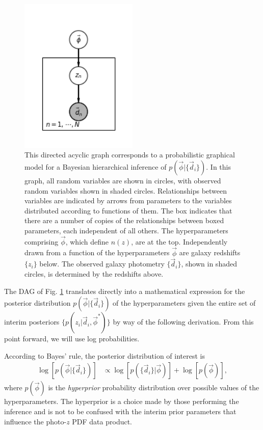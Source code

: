 \documentclass[iop]{emulateapj}
\begin{document}
\begin{figure}
	\begin{center}
		\includegraphics[width=0.5\textwidth]{pgm.png}
		\caption{This directed acyclic graph corresponds to a probabilistic graphical model for a Bayesian hierarchical inference of $p(\vec{\phi}|\{\vec{d}_{i}\})$.  In this graph, all random variables are shown in circles, with observed random variables shown in shaded circles.  Relationships between variables are indicated by arrows from parameters to the variables distributed according to functions of them.  The box indicates that there are a number of copies of the relationships between boxed parameters, each independent of all others.  The hyperparameters comprising $\vec{\phi}$, which define $n(z)$, are at the top.  Independently drawn from a function of the hyperparameters $\vec{\phi}$ are galaxy redshifts $\{z_{i}\}$ below.  The observed galaxy photometry $\{\vec{d}_{i}\}$, shown in shaded circles, is determined by the redshifts above.}
	\label{fig:pgm}
	\end{center}
\end{figure}

The DAG of Fig. \ref{fig:pgm} translates directly into a mathematical expression for the posterior distribution $p(\vec{\phi} | \{\vec{d}_{i}\})$ of the hyperparameters given the entire set of interim posteriors $\{p(z_{i} | \vec{d}_{i}, \vec{\phi}^{*})\}$ by way of the following derivation.  From this point forward, we will use log probabilities.

According to Bayes' rule, the posterior distribution of interest is
\begin{align}
\label{eq:hyper_bayes}
\log[p(\vec{\phi} | \{\vec{d}_{i}\})] &\propto \log[p(\{\vec{d}_{i}\} | \vec{\phi})] + \log[p(\vec{\phi})] ,
\end{align}
where $p(\vec{\phi})$ is the \textit{hyperprior} probability distribution over possible values of the hyperparameters.  The hyperprior is a choice made by those performing the inference and is not to be confused with the interim prior parameters that influence the photo-$z$ PDF data product.
\end{document}
